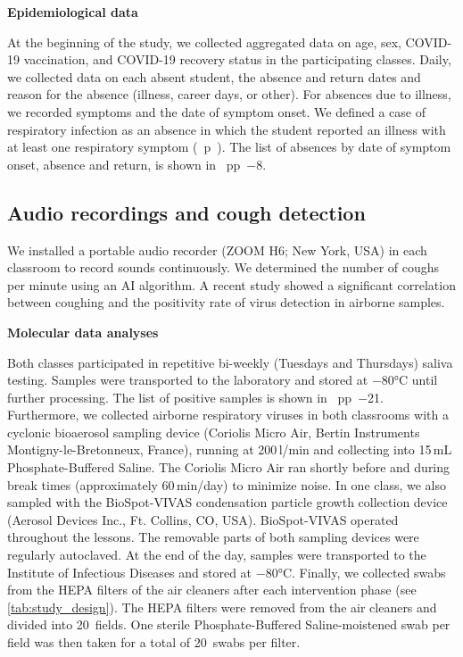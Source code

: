 \documentclass[fleqn,11pt]{wlscirep}
\begin{document}
\noindent\textbf{Epidemiological data} \smallskip

\noindent At the beginning of the study, we collected aggregated data on age, sex, COVID-19 vaccination, and COVID-19 recovery status in the participating classes. Daily, we collected data on each absent student, \ie the absence and return dates and reason for the absence (illness, career days, or other). For absences due to illness, we recorded symptoms and the date of symptom onset. We defined a case of respiratory infection as an absence in which the student reported an illness with at least one respiratory symptom (\supp~p~). The list of absences by date of symptom onset, absence and return, is shown in \supp~pp~$-$8.\medskip

\subsection*{Audio recordings and cough detection}

We installed a portable audio recorder (ZOOM H6; New York, USA) in each classroom to record sounds continuously. We determined the number of coughs per minute using an AI algorithm.\cite{Bertschinger2023IEEE} A recent study showed a significant correlation between coughing and the positivity rate of virus detection in airborne samples.\cite{Hanna2023PONE}

\noindent\textbf{Molecular data analyses} \smallskip

\noindent Both classes participated in repetitive bi-weekly (Tuesdays and Thursdays) saliva testing. Samples were transported to the laboratory and stored at $-$80°C until further processing.\cite{Huber2021} The list of positive samples is shown in \supp~pp~$-$21. Furthermore, we collected airborne respiratory viruses in both classrooms with a cyclonic bioaerosol sampling device (Coriolis Micro Air, Bertin Instruments Montigny-le-Bretonneux, France), running at 200\,l/min and collecting into 15\,mL Phosphate-Buffered Saline. The Coriolis Micro Air ran shortly before and during break times (approximately 60\,min/day) to minimize noise. In one class, we also sampled with the BioSpot-VIVAS condensation particle growth collection device (Aerosol Devices Inc., Ft. Collins, CO, USA).\cite{Lednicky2016AST} BioSpot-VIVAS operated throughout the lessons. The removable parts of both sampling devices were regularly autoclaved. At the end of the day, samples were transported to the Institute of Infectious Diseases and stored at $-$80°C. Finally, we collected swabs from the HEPA filters of the air cleaners after each intervention phase (see \cref{tab:study_design}). The HEPA filters were removed from the air cleaners and divided into 20~fields. One sterile Phosphate-Buffered Saline-moistened swab per field was then taken for a total of 20~swabs per filter. 
\end{document}
